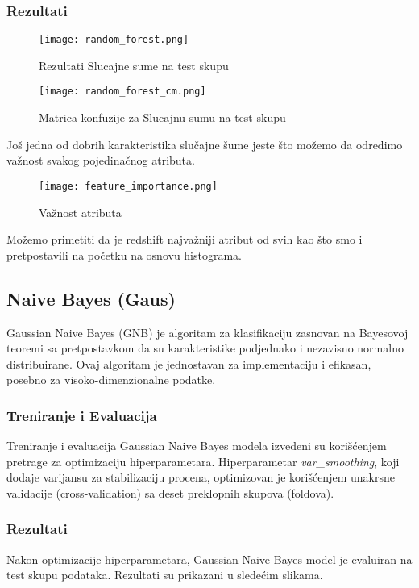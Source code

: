 \documentclass[a4paper,12pt]{article}
\begin{document}
\subsubsection{Rezultati}

\begin{figure}[H]
\centering
\texttt{[image: random\_forest.png]}
\caption{Rezultati Slucajne sume na test skupu}
\label{fig:random_forest}
\end{figure}

\begin{figure}[H]
\centering
\texttt{[image: random\_forest\_cm.png]}
\caption{Matrica konfuzije za Slucajnu sumu na test skupu}
\label{fig:random_forest_cm}
\end{figure}

Još jedna od dobrih karakteristika slučajne šume jeste što možemo da odredimo važnost svakog pojedinačnog atributa.

\begin{figure}[H]
    \centering
    \texttt{[image: feature\_importance.png]}
    \caption{Važnost atributa}
    \label{fig:feature_importance}
\end{figure}

Možemo primetiti da je redshift najvažniji atribut od svih kao što smo i pretpostavili na početku na osnovu histograma.

\subsection{Naive Bayes (Gaus)}
Gaussian Naive Bayes (GNB) je algoritam za klasifikaciju zasnovan na Bayesovoj teoremi sa pretpostavkom da su karakteristike podjednako i nezavisno normalno distribuirane. Ovaj algoritam je jednostavan za implementaciju i efikasan, posebno za visoko-dimenzionalne podatke.

\subsubsection{Treniranje i Evaluacija}
Treniranje i evaluacija Gaussian Naive Bayes modela izvedeni su korišćenjem pretrage za optimizaciju hiperparametara. Hiperparametar \textit{var\_smoothing}, koji dodaje varijansu za stabilizaciju procena, optimizovan je korišćenjem unakrsne validacije (cross-validation) sa deset preklopnih skupova (foldova).

\subsubsection{Rezultati}
Nakon optimizacije hiperparametara, Gaussian Naive Bayes model je evaluiran na test skupu podataka. Rezultati su prikazani u sledećim slikama.
\end{document}
